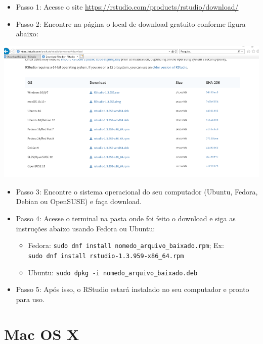 \documentclass[
  brazil,
]{book}
\providecommand{\tightlist}{%
  \setlength{\itemsep}{0pt}\setlength{\parskip}{0pt}}
\begin{document}
\begin{itemize}
\tightlist
\item
  Passo 1: Acesse o site \url{https://rstudio.com/products/rstudio/download/}\\
\item
  Passo 2: Encontre na página o local de download gratuito conforme figura abaixo:
\end{itemize}

\includegraphics[width=13.54in]{img/inst_1_rstudio}

\begin{itemize}
\tightlist
\item
  Passo 3: Encontre o sistema operacional do seu computador (Ubuntu, Fedora, Debian ou OpenSUSE) e faça download.\\
\item
  Passo 4: Acesse o terminal na pasta onde foi feito o download e siga as instruções abaixo usando Fedora ou Ubuntu:

  \begin{itemize}
  \tightlist
  \item
    Fedora: \texttt{sudo\ dnf\ install\ nomedo\_arquivo\_baixado.rpm}; Ex: \texttt{sudo\ dnf\ install\ rstudio-1.3.959-x86\_64.rpm}
  \item
    Ubuntu: \texttt{sudo\ dpkg\ -i\ nomedo\_arquivo\_baixado.deb}\\
  \end{itemize}
\item
  Passo 5: Após isso, o RStudio estará instalado no seu computador e pronto para uso.
\end{itemize}

\hypertarget{mac-os-x}{%
\section{Mac OS X}\label{mac-os-x}}
\end{document}
